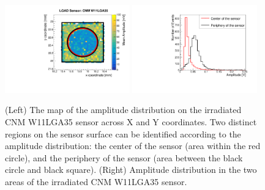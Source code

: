 \documentclass[preprint,1p]{elsarticle}
\begin{document}
\begin{figure}[htbp] 
\centering
\includegraphics[width=0.48\textwidth]{figs/USCSBoard_HPK50DIrradiated-CNMW11LGA35_Run936-961/CNM_irradiated_amp_Map.pdf} \hfill
\includegraphics[width=0.48\textwidth]{figs/USCSBoard_HPK50DIrradiated-CNMW11LGA35_Run936-961/CNM_irradiated_amp_1D.pdf} 
\caption{(Left) The map of the amplitude distribution on the irradiated CNM W11LGA35 sensor across X and Y coordinates. Two distinct regions on the sensor surface can be identified according to the amplitude distribution: the center of the sensor (area within the red circle), and the periphery of the sensor (area between the black circle and black square). (Right) Amplitude distribution in the two areas of the irradiated CNM W11LGA35 sensor.} 
\label{fig:Sensors} 
\end{figure} 
\end{document}

